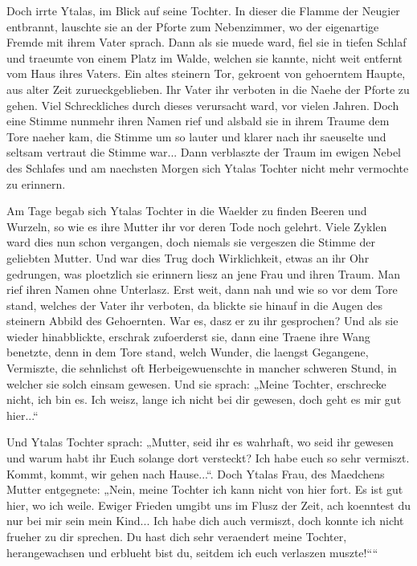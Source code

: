 \documentclass[a5paper,8pt]{book}
\begin{document}
Doch irrte Ytalas, im Blick auf seine Tochter. In dieser die Flamme der Neugier entbrannt, lauschte sie an der Pforte zum Nebenzimmer, wo der eigenartige Fremde mit ihrem Vater sprach. Dann als sie muede ward, fiel sie in tiefen Schlaf und traeumte von einem Platz im Walde, welchen sie kannte, nicht weit entfernt vom Haus ihres Vaters. Ein altes steinern Tor, gekroent von gehoerntem Haupte, aus alter Zeit zurueckgeblieben. Ihr Vater ihr verboten in die Naehe der Pforte zu gehen. Viel Schreckliches durch dieses verursacht ward, vor vielen Jahren. Doch eine Stimme nunmehr ihren Namen rief und alsbald sie in ihrem Traume dem Tore naeher kam, die Stimme um so lauter und klarer nach ihr saeuselte und seltsam vertraut die Stimme war... Dann verblaszte der Traum im ewigen Nebel des Schlafes und am naechsten Morgen sich Ytalas Tochter nicht mehr vermochte zu erinnern.

Am Tage begab sich Ytalas Tochter in die Waelder zu finden Beeren und Wurzeln, so wie es ihre Mutter ihr vor deren Tode noch gelehrt. Viele Zyklen ward dies nun schon vergangen, doch niemals sie vergeszen die Stimme der geliebten Mutter. Und war dies Trug doch Wirklichkeit, etwas an ihr Ohr gedrungen, was ploetzlich sie erinnern liesz an jene Frau und ihren Traum. Man rief ihren Namen ohne Unterlasz. Erst weit, dann nah und wie so vor dem Tore stand, welches der Vater ihr verboten, da blickte sie hinauf in die Augen des steinern Abbild des Gehoernten. War es, dasz er zu ihr gesprochen? Und als sie wieder hinabblickte, erschrak zufoerderst sie, dann eine Traene ihre Wang benetzte, denn in dem Tore stand, welch Wunder, die laengst Gegangene, Vermiszte, die sehnlichst oft Herbeigewuenschte in mancher schweren Stund, in welcher sie solch einsam gewesen. Und sie sprach: „Meine Tochter, erschrecke nicht, ich bin es. Ich weisz, lange ich nicht bei dir gewesen, doch geht es mir gut hier...“

Und Ytalas Tochter sprach: „Mutter, seid ihr es wahrhaft, wo seid ihr gewesen und warum habt ihr Euch solange dort versteckt? Ich habe euch so sehr vermiszt. Kommt, kommt, wir gehen nach Hause...“. Doch Ytalas Frau, des Maedchens Mutter entgegnete: „Nein, meine Tochter ich kann nicht von hier fort. Es ist gut hier, wo ich weile. Ewiger Frieden umgibt uns im Flusz der Zeit, ach koenntest du nur bei mir sein mein Kind... Ich habe dich auch vermiszt, doch konnte ich nicht frueher zu dir sprechen. Du hast dich sehr veraendert meine Tochter, herangewachsen und erblueht bist du, seitdem ich euch verlaszen muszte!““
\end{document}
